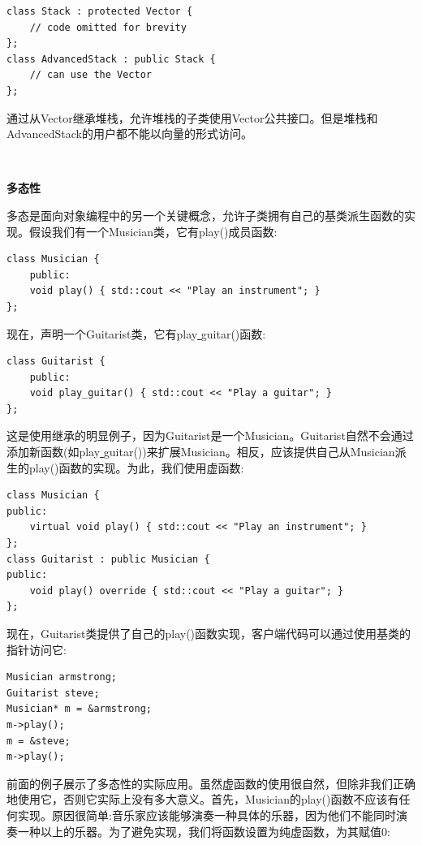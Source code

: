 \begin{lstlisting}[caption={}]
class Stack : protected Vector {
	// code omitted for brevity
};
class AdvancedStack : public Stack {
	// can use the Vector
};
\end{lstlisting}

通过从Vector继承堆栈，允许堆栈的子类使用Vector公共接口。但是堆栈和AdvancedStack的用户都不能以向量的形式访问。 \par

\noindent\textbf{}\ \par
\textbf{多态性} \ \par
多态是面向对象编程中的另一个关键概念，允许子类拥有自己的基类派生函数的实现。假设我们有一个Musician类，它有play()成员函数: \par

\begin{lstlisting}[caption={}]
class Musician {
	public:
	void play() { std::cout << "Play an instrument"; }
};
\end{lstlisting}

现在，声明一个Guitarist类，它有play\underline{ }guitar()函数: \par

\begin{lstlisting}[caption={}]
class Guitarist {
	public:
	void play_guitar() { std::cout << "Play a guitar"; }
};
\end{lstlisting}

这是使用继承的明显例子，因为Guitarist是一个Musician。Guitarist自然不会通过添加新函数(如play\underline{ }guitar())来扩展Musician。相反，应该提供自己从Musician派生的play()函数的实现。为此，我们使用虚函数: \par

\begin{lstlisting}[caption={}]
class Musician {
public:
	virtual void play() { std::cout << "Play an instrument"; }
};
class Guitarist : public Musician {
public:
	void play() override { std::cout << "Play a guitar"; }
};
\end{lstlisting}

现在，Guitarist类提供了自己的play()函数实现，客户端代码可以通过使用基类的指针访问它: \par

\begin{lstlisting}[caption={}]
Musician armstrong;
Guitarist steve;
Musician* m = &armstrong;
m->play();
m = &steve;
m->play();
\end{lstlisting}

前面的例子展示了多态性的实际应用。虽然虚函数的使用很自然，但除非我们正确地使用它，否则它实际上没有多大意义。首先，Musician的play()函数不应该有任何实现。原因很简单:音乐家应该能够演奏一种具体的乐器，因为他们不能同时演奏一种以上的乐器。为了避免实现，我们将函数设置为纯虚函数，为其赋值0: \par

